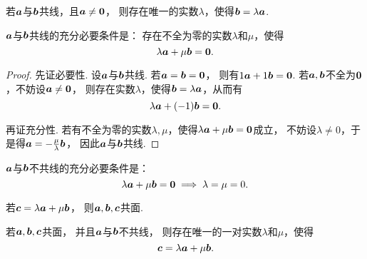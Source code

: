 \begin{theorem}
若\(\boldsymbol{a}\)与\(\boldsymbol{b}\)共线，且\(\boldsymbol{a}\neq\boldsymbol{0}\)，
则存在唯一的实数\(\lambda\)，使得\(\boldsymbol{b} = \lambda \boldsymbol{a}\).
\end{theorem}

\begin{theorem}\label{theorem:解析几何.两向量共线的充分必要条件1}
\(\boldsymbol{a}\)与\(\boldsymbol{b}\)共线的充分必要条件是：
存在不全为零的实数\(\lambda\)和\(\mu\)，使得\begin{equation*}
	\lambda \boldsymbol{a} + \mu \boldsymbol{b} = \boldsymbol{0}.
\end{equation*}
\begin{proof}
先证必要性.
设\(\boldsymbol{a}\)与\(\boldsymbol{b}\)共线.
若\(\boldsymbol{a}=\boldsymbol{b}=\boldsymbol{0}\)，
则有\(1\boldsymbol{a}+1\boldsymbol{b}=\boldsymbol{0}\).
若\(\boldsymbol{a},\boldsymbol{b}\)不全为\(\boldsymbol{0}\)，不妨设\(\boldsymbol{a}\neq\boldsymbol{0}\)，
则存在实数\(\lambda\)，使得\(\boldsymbol{b}=\lambda\boldsymbol{a}\)，从而有\begin{equation*}
	\lambda\boldsymbol{a}+(-1)\boldsymbol{b}=\boldsymbol{0}.
\end{equation*}

再证充分性.
若有不全为零的实数\(\lambda,\mu\)，使得\(\lambda \boldsymbol{a} + \mu \boldsymbol{b} = \boldsymbol{0}\)成立，
不妨设\(\lambda\neq0\)，于是得\(\boldsymbol{a}=-\frac{\mu}{\lambda}\boldsymbol{b}\)，
因此\(\boldsymbol{a}\)与\(\boldsymbol{b}\)共线.
\end{proof}
\end{theorem}

\begin{corollary}\label{theorem:解析几何.两向量不共线的充分必要条件1}
\(\boldsymbol{a}\)与\(\boldsymbol{b}\)不共线的充分必要条件是：\begin{equation*}
	\lambda \boldsymbol{a} + \mu \boldsymbol{b} = \boldsymbol{0}
	\implies
	\lambda = \mu = 0.
\end{equation*}
\end{corollary}

\begin{theorem}
若\(\boldsymbol{c} = \lambda \boldsymbol{a} + \mu \boldsymbol{b}\)，
则\(\boldsymbol{a},\boldsymbol{b},\boldsymbol{c}\)共面.
\end{theorem}

\begin{theorem}\label{theorem:解析几何.三向量共面的必要条件1}
若\(\boldsymbol{a},\boldsymbol{b},\boldsymbol{c}\)共面，
并且\(\boldsymbol{a}\)与\(\boldsymbol{b}\)不共线，
则存在唯一的一对实数\(\lambda\)和\(\mu\)，使得\begin{equation*}
	\boldsymbol{c} = \lambda \boldsymbol{a} + \mu \boldsymbol{b}.
\end{equation*}
\end{theorem}

